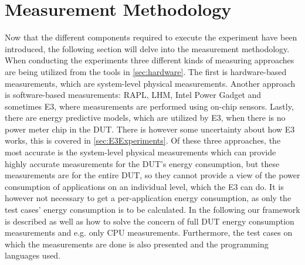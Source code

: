 \section{Measurement Methodology}\label{sec:Measurement_Methodology}

Now that the different components required to execute the experiment have been introduced, the following section will delve into the measurement methodology. When conducting the experiments three different kinds of measuring approaches are being utilized from the tools in \cref{sec:hardware}.
The first is hardware-based measurements, which are system-level physical measurements. Another approach is software-based measurements: RAPL, LHM, Intel Power Gadget and sometimes E3, where measurements are performed using on-chip sensors. Lastly, there are energy predictive models, which are utilized by E3, when there is no power meter chip in the DUT. There is however some uncertainty about how E3 works, this is covered in \cref{sec:E3Experiments}. Of these three approaches, the most accurate is the system-level physical measurements which can provide highly accurate measurements for the DUT's energy consumption, but these measurements are for the entire DUT, so they cannot provide a view of the power consumption of applications on an individual level, which the E3 can do. It is however not necessary to get a per-application energy consumption, as only the test cases' energy consumption is to be calculated. In the following our framework is described as well as how to solve the concern of full DUT energy consumption measurements and e.g. only CPU measurements. Furthermore, the test cases on which the measurements are done is also presented and the programming languages used.





%


